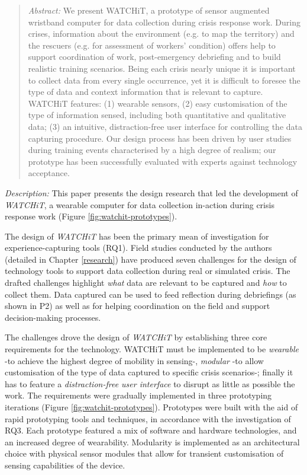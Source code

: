 \begin{quote}
\emph{Abstract:} We present WATCHiT, a prototype of sensor augmented wristband computer for data collection during crisis response work. During crises, information about the environment (e.g. to map the territory) and the rescuers (e.g. for assessment of workers' condition) offers help to support coordination of work, post-emergency debriefing and to build realistic training scenarios. Being each crisis nearly unique it is important to collect data from every single occurrence, yet it is difficult to foresee the type of data and context information that is relevant to capture. WATCHiT features: (1) wearable sensors, (2) easy customisation of the type of information sensed, including both quantitative and qualitative data; (3) an intuitive, distraction-free user interface for controlling the data capturing procedure. Our design process has been driven by user studies during training events characterised by a high degree of realism; our prototype has been successfully evaluated with experts against technology acceptance. 
\end{quote}

\emph{Description:} This paper presents the design research that led the development of \emph{WATCHiT}, a wearable computer for data collection in-action during crisis response work (Figure \ref{fig:watchit-prototypes}). 

The design of \emph{WATCHiT} has been the primary mean of investigation for experience-capturing tools (RQ1). Field studies conducted by the authors (detailed in Chapter \ref{research}) have produced seven challenges for the design of technology tools to support data collection during real or simulated crisis. The drafted challenges highlight \emph{what} data are relevant to be captured and \emph{how} to collect them. Data captured can be used to feed reflection during debriefings (as shown in P2) as well as for helping coordination on the field and support decision-making processes.

The challenges drove the design of \emph{WATCHiT} by establishing three core requirements for the technology. WATCHiT must be implemented to be \emph{wearable} -to achieve the highest degree of mobility in sensing-, \emph{modular} -to allow customisation of the type of data captured to specific crisis scenarios-; finally it has to feature a \emph{distraction-free user interface} to disrupt as little as possible the work. The requirements were gradually implemented in three prototyping iterations (Figure \ref{fig:watchit-prototypes}). Prototypes were built with the aid of rapid prototyping tools and techniques, in accordance with the investigation of RQ3.  Each prototype featured a mix of software and hardware technologies, and an increased degree of wearability. Modularity is implemented as an architectural choice with physical sensor modules that allow for transient customisation of sensing capabilities of the device.

